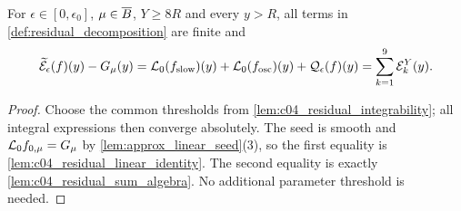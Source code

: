 \begin{lemma}
  \label{lem:c04_residual_identity}
  For $\epsilon\in[0,\epsilon_0]$, $\mu\in\overline{B}$, $Y\ge8R$ and every $y>R$, all terms in \cref{def:residual_decomposition} are finite and
  \begin{equation}\label{eqn:approx_residual_decomposition}
    \widetilde{\mathcal{E}}_\epsilon(f)(y)-G_\mu(y)=\mathcal{L}_0(f_{\textup{slow}})(y)+\mathcal{L}_0(f_{\textup{osc}})(y)+\mathcal{Q}_\epsilon(f)(y)=\sum_{k=1}^9\mathcal{E}_k^{Y}(y).
  \end{equation}
\end{lemma}
\begin{proof}
  Choose the common thresholds from \cref{lem:c04_residual_integrability}; all integral
  expressions then converge absolutely. The seed is smooth and
  $\mathcal{L}_0f_{0,\mu}=G_\mu$ by \cref{lem:approx_linear_seed}(3), so the first equality is
  \cref{lem:c04_residual_linear_identity}. The second equality is exactly
  \cref{lem:c04_residual_sum_algebra}. No additional parameter threshold is needed.
\end{proof}

